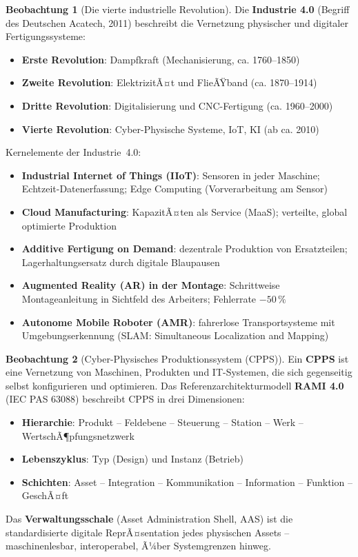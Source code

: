 ﻿\documentclass[a4paper,12pt]{report}
\theoremstyle{definition}
\newtheorem{beobachtung}{Beobachtung}
\begin{document}
\begin{beobachtung}[Die vierte industrielle Revolution]
Die \textbf{Industrie 4.0} (Begriff des Deutschen Acatech, 2011)
beschreibt die Vernetzung physischer und digitaler Fertigungssysteme:
\begin{itemize}
    \item[-] \textbf{Erste Revolution}: Dampfkraft (Mechanisierung, ca. 1760--1850)
    \item[-] \textbf{Zweite Revolution}: ElektrizitÃ¤t und FlieÃŸband (ca. 1870--1914)
    \item[-] \textbf{Dritte Revolution}: Digitalisierung und CNC-Fertigung (ca. 1960--2000)
    \item[-] \textbf{Vierte Revolution}: Cyber-Physische Systeme, IoT, KI (ab ca. 2010)
\end{itemize}
Kernelemente der Industrie~4.0:
\begin{itemize}
    \item[-] \textbf{Industrial Internet of Things (IIoT)}: Sensoren in jeder Maschine;
          Echtzeit-Datenerfassung; Edge Computing (Vorverarbeitung am Sensor)
    \item[-] \textbf{Cloud Manufacturing}: KapazitÃ¤ten als Service (MaaS);
          verteilte, global optimierte Produktion
    \item[-] \textbf{Additive Fertigung on Demand}: dezentrale Produktion
          von Ersatzteilen; Lagerhaltungsersatz durch digitale Blaupausen
    \item[-] \textbf{Augmented Reality (AR) in der Montage}: Schrittweise
          Montageanleitung in Sichtfeld des Arbeiters; Fehlerrate $-50\,\%$
    \item[-] \textbf{Autonome Mobile Roboter (AMR)}: fahrerlose Transportsysteme
          mit Umgebungserkennung (SLAM: Simultaneous Localization and Mapping)
\end{itemize}
\end{beobachtung}

\begin{beobachtung}[Cyber-Physisches Produktionssystem (CPPS)]
Ein \textbf{CPPS} ist eine Vernetzung von Maschinen, Produkten und
IT-Systemen, die sich gegenseitig selbst konfigurieren und optimieren.
Das Referenzarchitekturmodell \textbf{RAMI 4.0} (IEC PAS 63088)
beschreibt CPPS in drei Dimensionen:
\begin{itemize}
    \item[-] \textbf{Hierarchie}: Produkt -- Feldebene -- Steuerung -- Station -- Werk -- WertschÃ¶pfungsnetzwerk
    \item[-] \textbf{Lebenszyklus}: Typ (Design) und Instanz (Betrieb)
    \item[-] \textbf{Schichten}: Asset -- Integration -- Kommunikation -- Information -- Funktion -- GeschÃ¤ft
\end{itemize}
Das \textbf{Verwaltungsschale} (Asset Administration Shell, AAS) ist
die standardisierte digitale ReprÃ¤sentation jedes physischen Assets --
maschinenlesbar, interoperabel, Ã¼ber Systemgrenzen hinweg.
\end{beobachtung}
\end{document}

